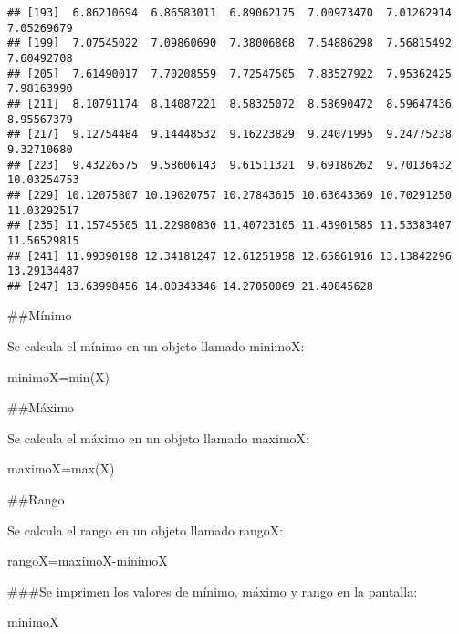 \documentclass[
]{article}
\newenvironment{Shaded}{\begin{snugshade}}{\end{snugshade}}
\newcommand{\FunctionTok}[1]{\textcolor[rgb]{0.00,0.00,0.00}{#1}}
\newcommand{\NormalTok}[1]{#1}
\newcommand{\OtherTok}[1]{\textcolor[rgb]{0.56,0.35,0.01}{#1}}
\newcommand{\SpecialCharTok}[1]{\textcolor[rgb]{0.00,0.00,0.00}{#1}}
\begin{document}
\begin{verbatim}
## [193]  6.86210694  6.86583011  6.89062175  7.00973470  7.01262914  7.05269679
## [199]  7.07545022  7.09860690  7.38006868  7.54886298  7.56815492  7.60492708
## [205]  7.61490017  7.70208559  7.72547505  7.83527922  7.95362425  7.98163990
## [211]  8.10791174  8.14087221  8.58325072  8.58690472  8.59647436  8.95567379
## [217]  9.12754484  9.14448532  9.16223829  9.24071995  9.24775238  9.32710680
## [223]  9.43226575  9.58606143  9.61511321  9.69186262  9.70136432 10.03254753
## [229] 10.12075807 10.19020757 10.27843615 10.63643369 10.70291250 11.03292517
## [235] 11.15745505 11.22980830 11.40723105 11.43901585 11.53383407 11.56529815
## [241] 11.99390198 12.34181247 12.61251958 12.65861916 13.13842296 13.29134487
## [247] 13.63998456 14.00343346 14.27050069 21.40845628
\end{verbatim}

\#\#Mínimo

Se calcula el mínimo en un objeto llamado minimoX:

\begin{Shaded}
\begin{Highlighting}[]
\NormalTok{minimoX}\OtherTok{=}\FunctionTok{min}\NormalTok{(X)}
\end{Highlighting}
\end{Shaded}

\#\#Máximo

Se calcula el máximo en un objeto llamado maximoX:

\begin{Shaded}
\begin{Highlighting}[]
\NormalTok{maximoX}\OtherTok{=}\FunctionTok{max}\NormalTok{(X)}
\end{Highlighting}
\end{Shaded}

\#\#Rango

Se calcula el rango en un objeto llamado rangoX:

\begin{Shaded}
\begin{Highlighting}[]
\NormalTok{rangoX}\OtherTok{=}\NormalTok{maximoX}\SpecialCharTok{{-}}\NormalTok{minimoX}
\end{Highlighting}
\end{Shaded}

\#\#\#Se imprimen los valores de mínimo, máximo y rango en la pantalla:

\begin{Shaded}
\begin{Highlighting}[]
\NormalTok{minimoX}
\end{Highlighting}
\end{Shaded}
\end{document}
